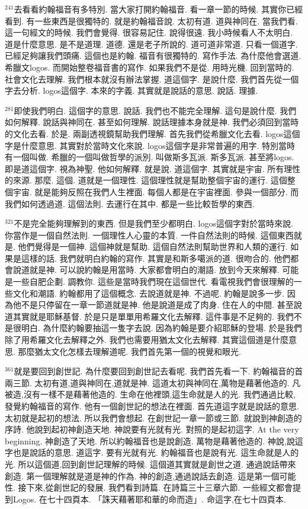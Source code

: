 \documentclass{book}
\begin{document}
$^{241}$去看看約翰福音有多特別.
當大家打開約翰福音.
看一章一節的時候.
其實你已經看到.
有一些東西是很獨特的.
就是約翰福音說.
太初有道.
道與神同在.
當我們看.
這一句經文的時候.
我們會覺得.
很容易記住.
說得很遠.
我小時候看人不太明白.
道是什麼意思.
是不是道理.
道德.
還是老子所說的.
道可道非常道.
只看一個道字.
已經足夠讓我們頭痛.
這個也是約翰.
福音有很獨特的.
寫作手法.
為什麼他會選道.
希臘文logos.
而開始整卷福音書的寫作.
如果我們不是從.
用時光機.
回到當時的.
社會文化去理解.
我們根本就沒有辦法掌握.
道這個字.
是說什麼.
我們首先從一個字去分析.
logos這個字.
本來的字義.
其實就是說話的意思.
說話.
理據.

$^{281}$即使我們明白.
這個字的意思.
說話.
我們也不能完全理解.
這句是說什麼.
我們如何解釋.
說話與神同在.
甚至如何理解.
說話理據本身就是神.
我們必須回到當時的文化去看.
於是.
兩副透視鏡幫助我們理解.
首先我們從希臘文化去看.
logos這個字是什麼意思.
其實對於當時文化來說.
logos這個字是非常普遍的用字.
特別當時有一個叫做.
希臘的一個叫做哲學的派別.
叫做斯多瓦派.
斯多瓦派.
甚至將logos.
即是道這個字.
視為神聖.
他如何解釋.
就是說.
道這個字.
其實就是宇宙.
所有理性的來源.
那麼.
這個.
道就是一個理性.
這個理性就是幫助整個宇宙的運行.
這個整個宇宙.
就是能夠反照在我們人生裡面.
每個人都是在宇宙裡面.
參與一個部分.
而我們如何透過道.
這個法則.
去運行在其中.
都是一些比較哲學的東西.

$^{321}$不是完全能夠理解到的東西.
但是我們至少都明白.
logos這個字對於當時來說.
你當作是一個自然法則.
一個理性人心靈的本質.
一件自然法則的時候.
這個東西就是.
他們覺得是一個神.
這個神就是幫助.
這個自然法則幫助世界和人類的運行.
如果是這樣的話.
我們就明白約翰的寫作.
其實是和斯多噶派的道.
很吻合的.
他們都會說道就是神.
可以說約翰是用當時.
大家都會明白的潮語.
放到今天來解釋.
可能是一些自肥企劃.
調教你.
這些是當時我們現在這個世代.
看電視我們會很理解的一些文化和潮語.
約翰都用了這個概念.
去說道就是神.
不過呢.
約翰是說多一步.
因為他不是只停留在一章一節道就是神.
他是說道是成了肉身.
住在人的中間.
甚至說道其實就是耶穌基督.
於是只是單單用希羅文化去解釋.
這件事是不足夠的.
我們不是很明白.
為什麼約翰要抽這一隻字去說.
因為約翰是要介紹耶穌的登場.
於是我們除了用希羅文化去解釋之外.
我們也需要用猶太文化去解釋.
其實這個道是什麼意思.
那麼猶太文化怎樣去理解道呢.
我們首先第一個的視覺和眼光.

$^{361}$就是要回到創世記.
為什麼要回到創世記去看呢.
我們首先看一下.
約翰福音的首兩三節.
太初有道,道與神同在,道就是神.
這道太初與神同在,萬物是藉著他造的.
凡被造,沒有一樣不是藉著他造的.
生命在他裡頭,這生命就是人的光.
我們通過比較,發覺約翰福音的寫作.
他有一個創世記的想法在裡面.
首先道這字就是說話的意思.
太初就是起初的想法.
所以我們會想起.
在創世記一章一節或三節.
就說到神創造的序詩.
他說到起初神創造天地.
神說要有光就有光.
對照的是起初這字.
At the very beginning.
神創造了天地.
所以約翰福音也是說創造.
萬物是藉著他造的.
神說,說這字也是說話的意思.
道這字.
要有光就有光.
約翰福音也是說有光.
這生命就是人的光.
所以這個道,回到創世記理解的時候.
這個道其實就是創世之道.
通過說話帶來創造.
第一個理解就是道是神的作為.
神的創造,通過說話去創造.
這是第一個可能性.
接下來,從創世記的發展.
我們看到詩篇.
在詩篇三十三章六節.
一些經文都會提到Logos.
在七十四頁本.
「誅天藉著耶和華的命而造」.
命這字,在七十四頁本.
\end{document}

